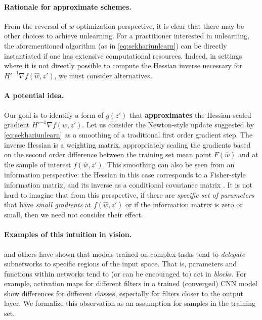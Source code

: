 
\paragraph{Rationale for approximate schemes.} From the reversal of $w$ optimization perspective, it is clear that there may be other choices to achieve unlearning.
For a practitioner interested in unlearning, the aforementioned algorithm (as in \eqref{eq:sekhariunlearn}) can be directly instantiated if one has extensive computational resources.
Indeed, in settings where it is not directly possible to compute the Hessian inverse necessary for $H'^{-1} \nabla f(\hat{w},z')$, we must consider alternatives. 

\paragraph{A potential idea.} Our goal is to identify a form of $g(z')$ that \textbf{approximates} the Hessian-scaled gradient $H'^{-1} \nabla f(\hat{w},z')$. 
Let us consider the Newton-style update suggested by 
\eqref{eq:sekhariunlearn}
as a smoothing of a traditional first order gradient step. 
The inverse Hessian is a weighting matrix, appropriately scaling the gradients based on the second order difference between the training set mean point $F(\hat{w})$ and at the sample of interest $f(\hat{w},z')$. 
This smoothing can also be seen from an information perspective: the Hessian in this case corresponds to a Fisher-style information matrix, and its inverse as a conditional covariance matrix \cite{Golatkar_2021_CVPR,golatkar2020forgetting}.
It is not hard to imagine that from this perspective, if there are {\em specific set of parameters} that have {\em small gradients} at $f(\hat{w},z')$ or if the information matrix is zero or small, then we need not consider their effect. 

\paragraph{Examples of this intuition in vision.} \cite{bau2017network,fong2018net2vec,Sun_2019_ICCV} and others have shown that models trained on complex tasks tend to \textit{delegate} subnetworks to specific regions of the input space. That is, parameters and functions within networks tend to (or can be encouraged to) act in \textit{blocks.}
For example, activation maps for different filters in a trained (converged) CNN model show differences for different classes, especially for filters closer to the output layer.
We formalize this observation as an assumption for samples in the training set.

